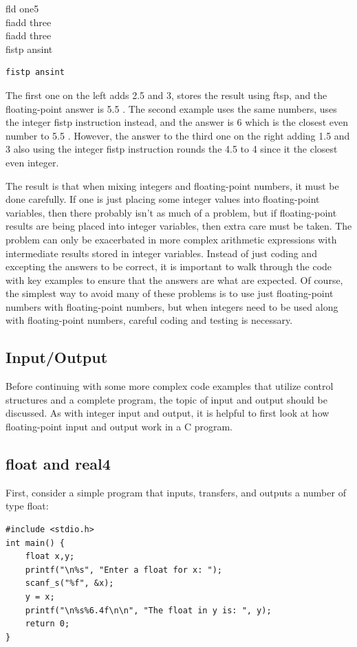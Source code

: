 \documentclass[10pt]{book}
\begin{document}
fld one5\\
fiadd three\\
fiadd three\\
fistp ansint

\begin{verbatim}
fistp ansint
\end{verbatim}

The first one on the left adds 2.5 and 3, stores the result using ftsp, and the floating-point answer is 5.5 . The second example uses the same numbers, uses the integer fistp instruction instead, and the answer is 6 which is the closest even number to 5.5 . However, the answer to the third one on the right adding 1.5 and 3 also using the integer fistp instruction rounds the 4.5 to 4 since it the closest even integer.

The result is that when mixing integers and floating-point numbers, it must be done carefully. If one is just placing some integer values into floating-point variables, then there probably isn't as much of a problem, but if floating-point results are being placed into integer variables, then extra care must be taken. The problem can only be exacerbated in more complex arithmetic expressions with intermediate results stored in integer variables. Instead of just coding and excepting the answers to be correct, it is important to walk through the code with key examples to ensure that the answers are what are expected. Of course, the simplest way to avoid many of these problems is to use just floating-point numbers with floating-point numbers, but when integers need to be used along with floating-point numbers, careful coding and testing is necessary.

\subsection{Input/Output}
Before continuing with some more complex code examples that utilize control structures and a complete program, the topic of input and output should be discussed. As with integer input and output, it is helpful to first look at how floating-point input and output work in a C program.

\subsection{float and real4}
First, consider a simple program that inputs, transfers, and outputs a number of type float:


\begin{verbatim}
#include <stdio.h>
int main() {
    float x,y;
    printf("\n%s", "Enter a float for x: ");
    scanf_s("%f", &x);
    y = x;
    printf("\n%s%6.4f\n\n", "The float in y is: ", y);
    return 0;
}
\end{verbatim}
\end{document}
